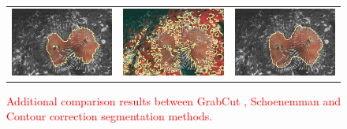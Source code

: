 \documentclass[smallextended]{svjour3}       %
\newcommand{\revision}[1]{\textcolor{red}{#1}}
\begin{document}
{{\begin{figure}[hp!]
\begin{tabular}{ccc}
		\includegraphics[scale=0.2]{images/segmentation/bc/coral/gc-seg.png} &
		\includegraphics[scale=0.2]{images/segmentation/schoenemann/coral/coral-seg.png} &
		\includegraphics[scale=0.2]{images/segmentation/bc/coral/corrected-seg.png}								
	\end{tabular}
	\caption{\revision{Additional comparison results between GrabCut \cite{rother04grabcut}, Schoenemman  \cite{schoenemann09linear} and Contour correction segmentation methods.}}
	\label{fig:more-segmentation-results}	
\end{figure}


}}
\end{document}
